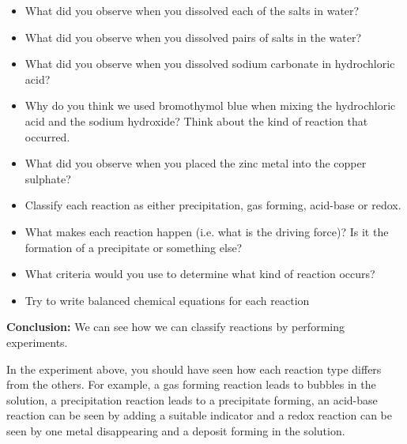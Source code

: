 \label{m38719*id6144}\begin{itemize}[noitemsep]
            \item What did you observe when you dissolved each of the salts in water?\item What did you observe when you dissolved pairs of salts in the water?\item What did you observe when you dissolved sodium carbonate in hydrochloric acid?\item Why do you think we used bromothymol blue when mixing the hydrochloric acid and the sodium hydroxide? Think about the kind of reaction that occurred.\item What did you observe when you placed the zinc metal into the copper sulphate?\item Classify each reaction as either precipitation, gas forming, acid-base or redox.\item What makes each reaction happen (i.e. what is the driving force)? Is it the formation of a precipitate or something else?\item What criteria would you use to determine what kind of reaction occurs?\item Try to write balanced chemical equations for each reaction\end{itemize}
        \par 
\label{m38719*eip-1904}\noindent{}\textbf{Conclusion: }\newline
    We can see how we can classify reactions by performing experiments. 
\par 
\label{m38719*eip-761}In the experiment above, you should have seen how each reaction type differs from the others. For example, a gas forming reaction leads to bubbles in the solution, a precipitation reaction leads to a precipitate forming, an acid-base reaction can be seen by adding a suitable indicator and a redox reaction can be seen by one metal disappearing and a deposit forming in the solution.\par  
\label{m38719*eip-796}

